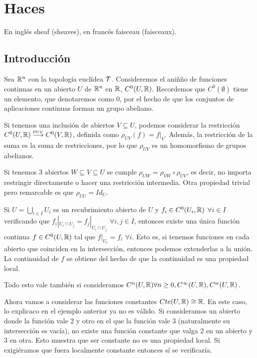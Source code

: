 \documentclass[GA.tex]{subfiles}
\begin{document}

\chapter{Haces}
En inglés sheaf (sheaves), en francés faisceau (faisceaux).

\section{Introducción}

\begin{ej}
Sea $\mathbb{R}^n$ con la topología euclídea $\mathcal{T}$. Consideremos el aniñño de funciones continuas en un abierto $U$ de $\mathbb{R}^n$ en $\mathbb{R}$, $C^0(U,\mathbb{R})$. Recordemos que $C^0(\emptyset)$ tiene un elemento, que denotaremos como $0$, por el hecho de que los conjuntos de aplicaciones continuas forman un grupo abeliano. 

Si tenemos una inclusión de abiertos $V\subseteq U$, podemos considerar la restricción $C^0(U,\mathbb{R})\overset{\rho_{UV}}{\longrightarrow} C^0(V,\mathbb{R})$, definida como $\rho_{UV}(f)=f|_V$. Además, la restricción de la suma es la suma de restricciones, por lo que $\rho_{UV}$ es un homomorfismo de grupos abelianos. 

Si tenemos 3 abiertos $W\subseteq V\subseteq U$ se cumple $\rho_{UW}=\rho_{VW}\circ\rho_{UV}$, es decir, no importa restringir directamente o hacer una restricción intermedia. Otra propiedad trivial pero remarcable es que $\rho_{UU}=Id_U$. 


Si $U=\bigcup_{i\in I} U_i$ es un recubrimiento abierto de $U$ y $f_i\in C^0(U_i,\mathbb{R})$ $\forall i\in I$ verificando que $f_i|_{U_i\cap U_j}=f_j|_{U_i\cap U_j}$ $\forall i,j\in I$, entonces existe una única función continua $f\in C^0(U,\mathbb{R})$ tal que $f|_{U_i}=f_i$ $\forall i$. Esto es, si tenemos funciones en cada abierto que coinciden en la intersección, entonces podemos extenderlas a la unión. La continuidad de $f$ se obtiene del hecho de que la continuidad es una propiedad local. 

Todo esto vale también si consideramos $C^n(U,\mathbb{R})\forall n\geq 0, C^\infty(U,\mathbb{R}), C^w(U,\mathbb{R})$.
\end{ej}

\begin{ej}
Ahora vamos a considerar las funciones constantes $Cte(U,\mathbb{R})\cong \mathbb{R}$. En este caso, lo explicaco en el ejemplo anterior ya no es válido. Si consideramos un abierto donde la función vale 2 y otro en el que la función vale 3 (naturalmente su intersección es vacía), no existe una función constante que valga 2 en un abierto y 3 en otra. Esto muestra que ser constante no es una propiedad local. Si exigiéramos que fuera localmente constante entonces sí se verificaría.
\end{ej}
\end{document}
